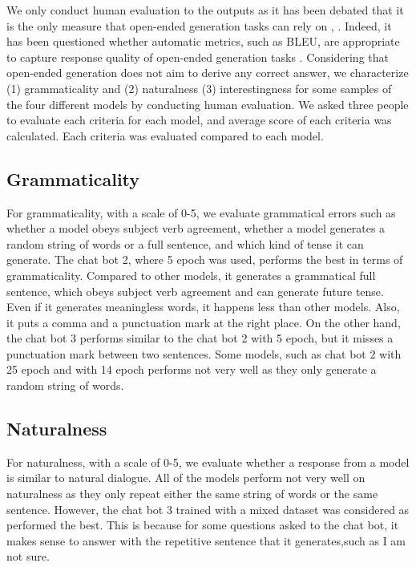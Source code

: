 \documentclass[11pt,a4paper]{article}
\begin{document}
We only conduct  human evaluation to the outputs as it has been debated that it is the only  measure that open-ended generation tasks can rely on \cite{li2016deep}, \cite{wiseman2017challenges}. Indeed, it has been questioned whether automatic  metrics, such as BLEU, are appropriate to capture response quality of open-ended generation tasks \cite{dai2015semi} \cite{galley2015deltableu}.  Considering that open-ended generation does not aim to derive any correct answer, we characterize (1) grammaticality and (2) naturalness (3) interestingness for some samples of the four different models by conducting human evaluation. We asked three people to evaluate each criteria for each model, and average score of each criteria was calculated. Each criteria was evaluated compared to each model.



\subsection{Grammaticality}

For grammaticality, with a scale of 0-5, we evaluate grammatical errors such as whether a model obeys subject verb agreement, whether a model generates a random string of words or a full sentence, and which kind of tense it can generate. 
The chat bot 2, where 5 epoch was used, performs the best in terms of grammaticality. Compared to other models, it generates a grammatical full sentence, which obeys subject verb agreement and can generate future tense. Even if it generates meaningless words, it happens less than other models. Also, it puts a comma and a punctuation mark at the right place. On the other hand, the chat bot 3 performs similar to  the chat bot 2 with 5 epoch, but it misses a punctuation mark between two sentences. Some models, such as chat bot 2 with 25 epoch and with 14 epoch performs not very well as they only generate a random string of words. 

\subsection{Naturalness}

For naturalness, with a scale of 0-5, we evaluate whether a response from a model is similar to natural dialogue. All of the models perform not very well on naturalness as they only repeat either the same string of words or the same sentence. However, the chat bot 3 trained with a mixed dataset was considered as performed the best. This is because for some questions asked to the chat bot, it makes sense to answer with the repetitive sentence that it generates,such as I am not sure.
\end{document}

